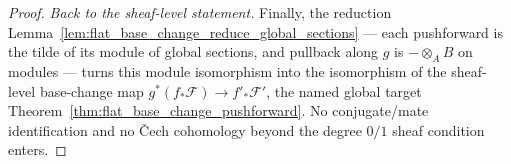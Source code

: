 \begin{theorem}
\begin{proof}
    \emph{Back to the sheaf-level statement.} Finally, the reduction
    Lemma~\ref{lem:flat_base_change_reduce_global_sections} — each pushforward is the tilde of its module
    of global sections, and pullback along \(g\) is \(-\otimes_A B\) on modules — turns this module
    isomorphism into the isomorphism of the sheaf-level base-change map
    \(g^*(f_*\mathcal{F}) \to f'_*\mathcal{F}'\), the named global target
    Theorem~\ref{thm:flat_base_change_pushforward}. No conjugate/mate identification and no {\v C}ech
    cohomology beyond the degree \(0/1\) sheaf condition enters.
  \end{proof}
\end{theorem}
